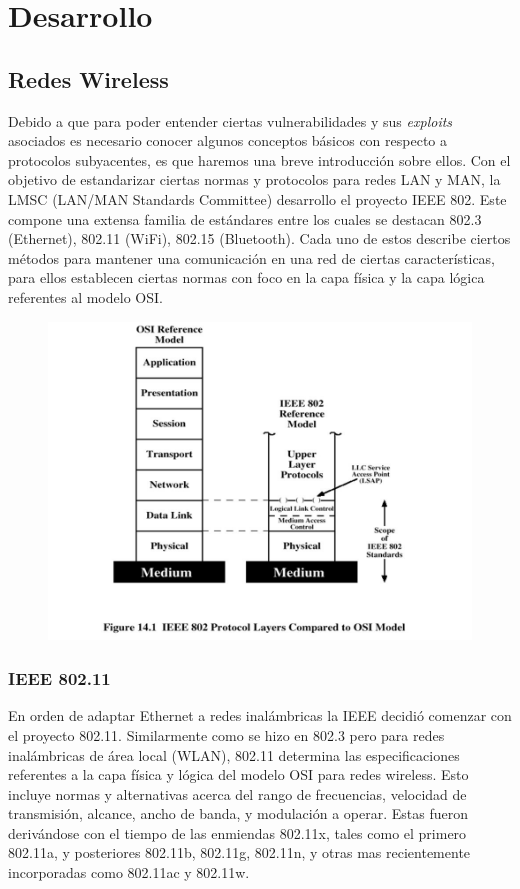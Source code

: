 \documentclass[10pt,a4paper]{article}
\begin{document}
\section{Desarrollo}
\subsection{Redes Wireless}
Debido a que para poder entender ciertas vulnerabilidades y sus \textit{exploits} asociados es necesario conocer algunos conceptos básicos con respecto a protocolos subyacentes, es que haremos una breve introducción sobre ellos. Con el objetivo de estandarizar ciertas normas y protocolos para redes LAN y MAN, la LMSC (LAN/MAN Standards Committee) desarrollo el proyecto IEEE 802. Este compone una extensa familia de estándares entre los cuales se destacan 802.3 (Ethernet), 802.11 (WiFi), 802.15 (Bluetooth). Cada uno de estos describe ciertos métodos para mantener una comunicación en una red de ciertas características, para ellos establecen ciertas normas con foco en la capa física y la capa lógica referentes al modelo OSI.

\begin{figure}[H]
\centerline{\includegraphics[scale=0.5]{images/802_protocol_layers.jpg}}
\caption{}
\end{figure}

\pagebreak

\subsubsection{IEEE 802.11}
En orden de adaptar Ethernet a redes inalámbricas la IEEE decidió comenzar con el proyecto 802.11. Similarmente como se hizo en 802.3 pero para redes inalámbricas de área local (WLAN), 802.11 determina las especificaciones referentes a la capa física y lógica del modelo OSI para redes wireless. Esto incluye normas y alternativas acerca del rango de frecuencias, velocidad de transmisión, alcance, ancho de banda, y modulación a operar. Estas fueron derivándose con el tiempo de las enmiendas 802.11x, tales como el primero 802.11a, y posteriores 802.11b, 802.11g, 802.11n, y otras mas recientemente incorporadas como 802.11ac y 802.11w.
\end{document}
